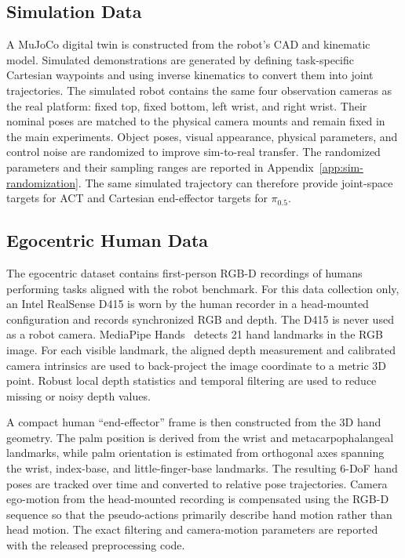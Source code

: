 \documentclass[10pt,conference]{IEEEtran}
\begin{document}
\subsection{Simulation Data}

A MuJoCo digital twin is constructed from the robot's CAD and kinematic model.
Simulated demonstrations are generated by defining task-specific Cartesian
waypoints and using inverse kinematics to convert them into joint trajectories.
The simulated robot contains the same four observation cameras as the real
platform: fixed top, fixed bottom, left wrist, and right wrist. Their nominal
poses are matched to the physical camera mounts and remain fixed in the main
experiments. Object poses, visual appearance, physical parameters, and control
noise are randomized to improve sim-to-real transfer. The randomized parameters
and their sampling ranges are reported in
Appendix~\ref{app:sim-randomization}. The same simulated trajectory can
therefore provide joint-space targets for ACT and Cartesian end-effector targets
for $\pi_{0.5}$.

\subsection{Egocentric Human Data}

The egocentric dataset contains first-person RGB-D recordings of humans
performing tasks aligned with the robot benchmark. For this data collection
only, an Intel RealSense D415 is worn by the human recorder in a head-mounted
configuration and records synchronized RGB and depth. The D415 is never used as
a robot camera. MediaPipe
Hands~\cite{zhang2020mediapipehands} detects 21 hand landmarks in the RGB image.
For each visible landmark, the aligned depth measurement and calibrated camera
intrinsics are used to back-project the image coordinate to a metric 3D point.
Robust local depth statistics and temporal filtering are used to reduce missing
or noisy depth values.

A compact human ``end-effector'' frame is then constructed from the 3D hand
geometry. The palm position is derived from the wrist and metacarpophalangeal
landmarks, while palm orientation is estimated from orthogonal axes spanning
the wrist, index-base, and little-finger-base landmarks. The resulting 6-DoF
hand poses are tracked over time and converted to relative pose trajectories.
Camera ego-motion from the head-mounted recording is compensated using the
RGB-D sequence so that the pseudo-actions primarily describe hand motion rather
than head motion. The exact filtering and camera-motion parameters are reported
with the released preprocessing code.
\end{document}
